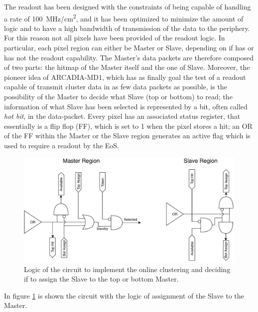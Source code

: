         The readout has been designed with the constraints of being capable of handling a rate of \SI{100}{MHz/cm\squared}, and it has been optimized to minimize the amount of logic and to have a high bandwidth of transmission of the data to the periphery. For this reason not all pixels have been provided of the readout logic.
        In particular, each pixel region can either be Master or Slave, depending on if has or has not the readout capability. 
        The Master's data packets are therefore composed of two parts: the hitmap of the Master itself and the one of Slave. 
        Moreover, the pioneer idea of ARCADIA-MD1, which has as finally goal the test of a readout capable of transmit cluster data in as few data packets as possible, is the possibility of the Master to decide what Slave (top or bottom) to read; the information of what Slave has been selected is represented by a bit, often called \emph{hot bit}, in the data-packet.
        Every pixel has an associated status register, that essentially is a flip flop (FF), which is set to 1 when the pixel stores a hit; an OR of the FF within the Master or the Slave region generates an active flag which is used to require a readout by the EoS.  
        \begin{figure}[h!]
            \centering
            \includegraphics[width=.95\linewidth]{figures/ARCADIA/clustering_logic.pdf}
            \caption{Logic of the circuit to implement the online clustering and deciding if to assign the Slave to the top or bottom Master.}
            \label{fig:clustering_logic}
        \end{figure}
        In figure \ref{fig:clustering_logic} is shown the circuit with the logic of assignment of the Slave to the Master.
        

